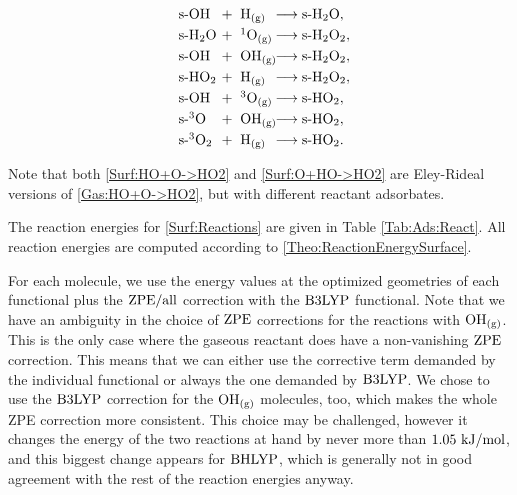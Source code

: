 \documentclass[8.5pt,twoside,twocolumn]{article}
\newcommand\zpe{\enmat{\te{ZPE}}}
\newcommand\zpeall{\enmat{\zpe/\te{all}}}
\newcommand\sur{\enmat{\te{s-}}}
\newcommand\gas{\enmat{_\te{(g)}}}
\newcommand\singo{\enmat{{^1\te{O}}}}
\newcommand\tripo{\enmat{{^3\te{O}}}}
\newcommand\tripot{\enmat{{^3\ot}}}
\newcommand\kmo{\enmat{\te {kJ/mol}}}
\theoremstyle{standard}
\begin{document}
\renewcommand\ronebox[1]{\makebox[1cm][l]{\enmat{#1}}}
\renewcommand\rtwobox[1]{\makebox[1.cm][l]{\ \enmat{#1}}}
\renewcommand\prodbox[1]{\makebox[1.65cm][l]{\enmat{#1}}}
\begin{subequations}
\begin{align}
   \label{Surf:HO+H->H2O}
   \ronebox{\sur\ho}+\rtwobox{\te{H}\gas}\prodbox{\chemar\sur\hto,} \\ 
   \label{Surf:H2O+O->H2O2}
   \ronebox{\sur\hto}+\rtwobox{\singo\gas}\prodbox{\chemar\sur\htot,} \\
   \label{Surf:HO+HO->H2O2}
   \ronebox{\sur\ho}+\rtwobox{\ho\gas}\prodbox{\chemar\sur\htot,} \\
   \label{Surf:HO2+H->H2O2}
   \ronebox{\sur\hot}+\rtwobox{\te{H}\gas}\prodbox{\chemar\sur\htot,} \\
   \label{Surf:HO+O->HO2}
   \ronebox{\sur\ho}+\rtwobox{\tripo\gas}\prodbox{\chemar\sur\hot,} \\
   \label{Surf:O+HO->HO2}
   \ronebox{\sur\tripo}+\rtwobox{\ho\gas}\prodbox{\chemar\sur\hot,} \\
   \label{Surf:3O2+H->HO2}
   \ronebox{\sur\tripot}+\rtwobox{\te{H}\gas}\prodbox{\chemar\sur\hot.}
\end{align}
\label{Surf:Reactions}
\end{subequations}

Note that both \eqref{Surf:HO+O->HO2} and \eqref{Surf:O+HO->HO2} are Eley-Rideal
versions of \eqref{Gas:HO+O->HO2}, but with different reactant adsorbates.

The reaction energies for \eqref{Surf:Reactions} are given in Table \ref{Tab:Ads:React}.
All reaction energies are computed according to \eqref{Theo:ReactionEnergySurface}.

For each molecule, we use the energy values at the optimized geometries of each functional plus
the $\zpeall$ correction with the $\text{B3LYP}$ functional. Note that we have an ambiguity in the choice
of $\zpe$ corrections for the reactions with $\ho\gas$. This is the only
case where the gaseous reactant does have a non-vanishing $\zpe$ correction.
This means that we can either use the corrective term demanded by the
individual functional or always the one demanded by $\text{B3LYP}$. We chose to use
the $\text{B3LYP}$ correction for the $\ho\gas$ molecules, too, which makes the whole
ZPE correction more consistent. This choice may be challenged, however it 
changes the energy of the two reactions at hand by never more than $1.05~\kmo$,
and this biggest change appears for $\text{BHLYP}$, which is generally not in good
agreement with the rest of the reaction energies anyway.
\end{document}
